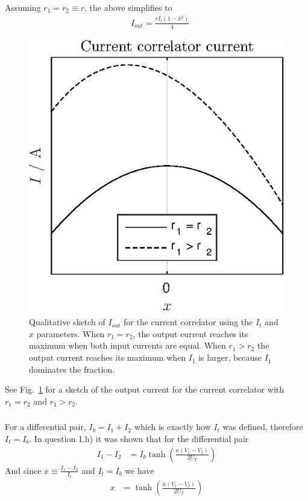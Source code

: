 \subsubsection{}
Assuming \(r_1=r_2\equiv r\), the above simplifies to 
\begin{align}
    &I_{out} = \frac{rI_t(1-x^2)}{4}
    \label{eq:q4}
\end{align}
\begin{figure}
    \center
    \includegraphics{prelab3.eps}
    \caption{Qualitative sketch of $I_{out}$ for the current correlator using the $I_t$ and $x$ parameters. When \(r_1=r_2\), 
        the output current reaches its maximum when both input currents are equal. When \(r_1 > r_2\) the output current reaches
    its maximum when \(I_1\) is larger, because \(I_1\) dominates the fraction.}
    \label{fig:q3}
\end{figure}
See Fig.~\ref{fig:q3} for a sketch of the output current for the current correlator with \(r_1=r_2\) and \(r_1 > r_2\).
\subsubsection{}
For a differential pair, \(I_b = I_1+I_2\) which is exactly how \(I_t\) was defined, therefore \(I_t=I_b\).
In question 1.h) it was shown that for the differential pair
\begin{align*}
    I_1-I_2 &= I_b \tanh\left(\frac{\kappa(V_1-V_2)}{2U_T}\right)
\end{align*}
And since \(x\equiv \frac{I_1-I_2}{I_t}\) and \(I_t=I_b\) we have
\begin{align}
    x &= \tanh\left(\frac{\kappa(V_1-V_2)}{2U_T}\right)
    \label{eq:q4-2}
\end{align}
